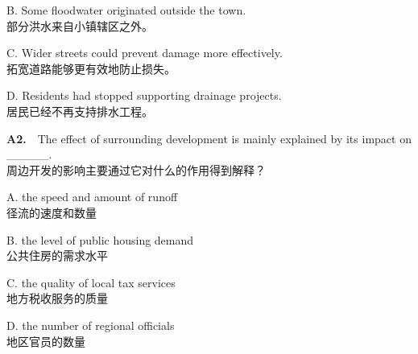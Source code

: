 \documentclass[a4paper,11pt,openany]{report}
\newcommand{\zhline}[1]{{\CJKsf\color{bodygrey}#1}}
\begin{document}
\begin{samepage}
B. Some floodwater originated outside the town.\\
\zhline{部分洪水来自小镇辖区之外。}
\par\end{samepage}

\begin{samepage}
C. Wider streets could prevent damage more effectively.\\
\zhline{拓宽道路能够更有效地防止损失。}
\par\end{samepage}

\begin{samepage}
D. Residents had stopped supporting drainage projects.\\
\zhline{居民已经不再支持排水工程。}
\par\end{samepage}

\begin{samepage}
\textbf{A2.}　The effect of surrounding development is mainly explained by its impact on \_\_\_\_\_.\\
\zhline{周边开发的影响主要通过它对什么的作用得到解释？}
\par\end{samepage}

\begin{samepage}
A. the speed and amount of runoff\\
\zhline{径流的速度和数量}
\par\end{samepage}

\begin{samepage}
B. the level of public housing demand\\
\zhline{公共住房的需求水平}
\par\end{samepage}

\begin{samepage}
C. the quality of local tax services\\
\zhline{地方税收服务的质量}
\par\end{samepage}

\begin{samepage}
D. the number of regional officials\\
\zhline{地区官员的数量}
\par\end{samepage}
\end{document}
